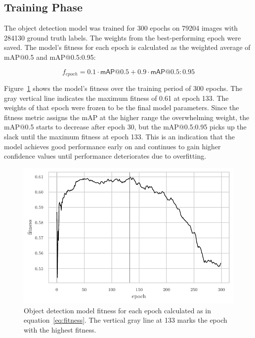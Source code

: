\documentclass[draft,final]{vutinfth} %
\begin{document}
\subsection{Training Phase}
\label{ssec:yolo-training}

The object detection model was trained for 300 epochs on 79204 images
with 284130 ground truth labels. The weights from the best-performing
epoch were saved. The model's fitness for each epoch is calculated as
the weighted average of \textsf{mAP}@0.5 and \textsf{mAP}@0.5:0.95:

\begin{equation}
  \label{eq:fitness}
  f_{epoch} = 0.1 \cdot \mathsf{mAP}@0.5 + 0.9 \cdot \mathsf{mAP}@0.5\mathrm{:}0.95
\end{equation}

Figure~\ref{fig:fitness} shows the model's fitness over the training
period of 300 epochs. The gray vertical line indicates the maximum
fitness of 0.61 at epoch 133. The weights of that epoch were frozen to
be the final model parameters. Since the fitness metric assigns the
\textsf{mAP} at the higher range the overwhelming weight, the
\textsf{mAP}@0.5 starts to decrease after epoch 30, but the
\textsf{mAP}@0.5:0.95 picks up the slack until the maximum fitness at
epoch 133. This is an indication that the model achieves good
performance early on and continues to gain higher confidence values
until performance deteriorates due to overfitting.

\begin{figure}
  \centering
  \includegraphics{graphics/model_fitness.pdf}
  \caption[Object detection fitness per epoch.]{Object detection model
    fitness for each epoch calculated as in
    equation~\ref{eq:fitness}. The vertical gray line at 133 marks the
    epoch with the highest fitness.}
  \label{fig:fitness}
\end{figure}
\end{document}
